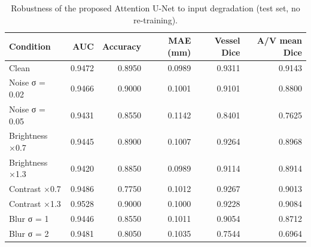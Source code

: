 \begin{table}
\caption{Robustness of the proposed Attention U-Net to input degradation (test set, no re-training).}
\label{tab:robustness}
\begin{tabular}{lrrrrr}
\toprule
Condition & AUC & Accuracy & MAE (mm) & Vessel Dice & A/V mean Dice \\
\midrule
Clean & 0.9472 & 0.8950 & 0.0989 & 0.9311 & 0.9143 \\
Noise σ = 0.02 & 0.9466 & 0.9000 & 0.1001 & 0.9101 & 0.8800 \\
Noise σ = 0.05 & 0.9431 & 0.8550 & 0.1142 & 0.8401 & 0.7625 \\
Brightness ×0.7 & 0.9445 & 0.8900 & 0.1007 & 0.9264 & 0.8968 \\
Brightness ×1.3 & 0.9420 & 0.8850 & 0.0989 & 0.9114 & 0.8914 \\
Contrast ×0.7 & 0.9486 & 0.7750 & 0.1012 & 0.9267 & 0.9013 \\
Contrast ×1.3 & 0.9528 & 0.9000 & 0.1000 & 0.9228 & 0.9084 \\
Blur σ = 1 & 0.9446 & 0.8550 & 0.1011 & 0.9054 & 0.8712 \\
Blur σ = 2 & 0.9481 & 0.8050 & 0.1035 & 0.7544 & 0.6964 \\
\bottomrule
\end{tabular}
\end{table}
